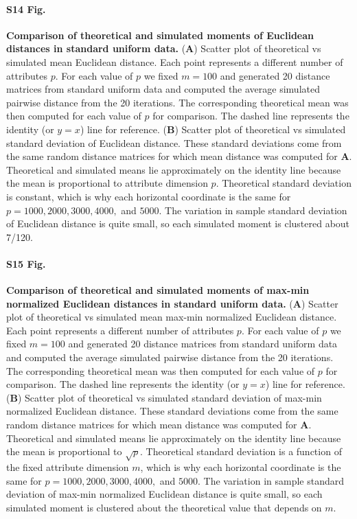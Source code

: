 \documentclass[10pt,letterpaper]{article}
\begin{document}
\paragraph*{S14 Fig.}
\hypertarget{S14_Fig}{
{\bf Comparison of theoretical and simulated moments of Euclidean distances in standard uniform data.} (\textbf{A}) Scatter plot of theoretical vs simulated mean Euclidean distance. Each point represents a different number of attributes $p$. For each value of $p$ we fixed $m=100$ and generated 20 distance matrices from standard uniform data and computed the average simulated pairwise distance from the 20 iterations. The corresponding theoretical mean was then computed for each value of $p$ for comparison. The dashed line represents the identity (or $y=x$) line for reference. (\textbf{B}) Scatter plot of theoretical vs simulated standard deviation of Euclidean distance. These standard deviations come from the same random distance matrices for which mean distance was computed for \textbf{A}. Theoretical and simulated means lie approximately on the identity line because the mean is proportional to attribute dimension $p$. Theoretical standard deviation is constant, which is why each horizontal coordinate is the same for $p=1000,2000,3000,4000,$ and $5000$. The variation in sample standard deviation of Euclidean distance is quite small, so each simulated moment is clustered about 7/120.}

\paragraph*{S15 Fig.}
\hypertarget{S15_Fig}{
{\bf Comparison of theoretical and simulated moments of max-min normalized Euclidean distances in standard uniform data.} (\textbf{A}) Scatter plot of theoretical vs simulated mean max-min normalized Euclidean distance. Each point represents a different number of attributes $p$. For each value of $p$ we fixed $m=100$ and generated 20 distance matrices from standard uniform data and computed the average simulated pairwise distance from the 20 iterations. The corresponding theoretical mean was then computed for each value of $p$ for comparison. The dashed line represents the identity (or $y=x$) line for reference. (\textbf{B}) Scatter plot of theoretical vs simulated standard deviation of max-min normalized Euclidean distance. These standard deviations come from the same random distance matrices for which mean distance was computed for \textbf{A}. Theoretical and simulated means lie approximately on the identity line because the mean is proportional to $\sqrt{p}$. Theoretical standard deviation is a function of the fixed attribute dimension $m$, which is why each horizontal coordinate is the same for $p=1000,2000,3000,4000,$ and $5000$. The variation in sample standard deviation of max-min normalized Euclidean distance is quite small, so each simulated moment is clustered about the theoretical value that depends on $m$.}
\end{document}
